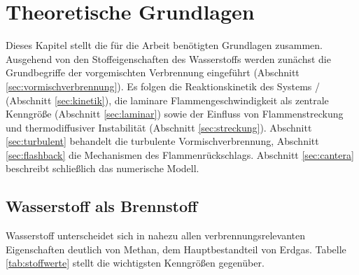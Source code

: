 \chapter{Theoretische Grundlagen}\label{chapter:grundlagen}

Dieses Kapitel stellt die für die Arbeit benötigten Grundlagen zusammen.
Ausgehend von den Stoffeigenschaften des Wasserstoffs werden zunächst die
Grundbegriffe der vorgemischten Verbrennung eingeführt
(Abschnitt \ref{sec:vormischverbrennung}). Es folgen die Reaktionskinetik des
Systems / (Abschnitt \ref{sec:kinetik}), die laminare
Flammengeschwindigkeit als zentrale Kenngröße (Abschnitt \ref{sec:laminar})
sowie der Einfluss von Flammenstreckung und thermodiffusiver Instabilität
(Abschnitt \ref{sec:streckung}). Abschnitt \ref{sec:turbulent} behandelt die
turbulente Vormischverbrennung, Abschnitt \ref{sec:flashback} die Mechanismen
des Flammenrückschlags. Abschnitt \ref{sec:cantera} beschreibt schließlich das
numerische Modell.

\section{Wasserstoff als Brennstoff}\label{sec:wasserstoff}

Wasserstoff unterscheidet sich in nahezu allen verbrennungsrelevanten
Eigenschaften deutlich von Methan, dem Hauptbestandteil von Erdgas.
Tabelle \ref{tab:stoffwerte} stellt die wichtigsten Kenngrößen gegenüber.

